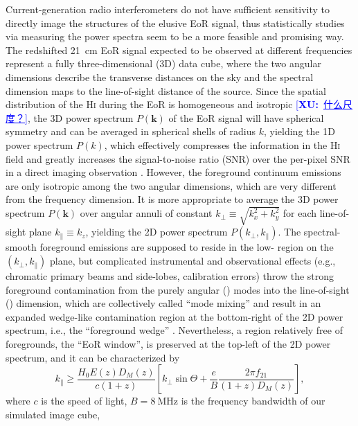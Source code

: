 \documentclass[modern]{aastex62}
\newcommand{\Hi}{H\textsc{i}}
\newcommand{\klos}{\text{$k_{\parallel}$}}
\newcommand{\kperp}{\text{$k_{\bot}$}}
\newcommand{\XU}[1]{\textcolor{blue}{[\textbf{XU:}~\uline{#1}]}}
\begin{document}
Current-generation radio interferometers do not have sufficient sensitivity
to directly image the structures of the elusive EoR signal,
thus statistically studies via measuring the power spectra seem to be
a more feasible and promising way.
The redshifted 21~cm EoR signal expected to be observed at different
frequencies represent a fully three-dimensional (3D) data cube, where the
two angular dimensions describe the transverse distances on the sky and
the spectral dimension maps to the line-of-sight distance of the source.
Since the spatial distribution of the \Hi{} during the EoR is homogeneous
and isotropic \XU{什么尺度？},
the 3D power spectrum $P(\mathbf{k})$ of the EoR signal
will have spherical symmetry and can be averaged in spherical shells of
radius $k$, yielding the 1D power spectrum $P(k)$, which effectively
compresses the information in the \Hi{} field and greatly increases the
signal-to-noise ratio (SNR) over the per-pixel SNR in a direct imaging
observation \citep{morales2004,morales2006,datta2010}.
However, the foreground continuum emissions are only isotropic among the
two angular dimensions, which are very different from the frequency
dimension.
It is more appropriate to average the 3D power spectrum $P(\mathbf{k})$
over angular annuli of constant $\kperp \equiv \sqrt{k_x^2 + k_y^2}$
for each line-of-sight plane $\klos \equiv k_z$, yielding the 2D power
spectrum $P(\kperp, \klos)$.
The spectral-smooth foreground emissions are supposed to reside in the
low-\klos{} region on the $(\kperp, \klos)$ plane,
but complicated instrumental and observational effects (e.g., chromatic
primary beams and side-lobes, calibration errors) throw the strong
foreground contamination from the purely angular (\kperp) modes into the
line-of-sight (\klos) dimension, which are collectively called
\enquote{mode mixing} and result in an expanded wedge-like contamination
region at the bottom-right of the 2D power spectrum, i.e., the
\enquote{foreground wedge} \citep[e.g.,][]{datta2010,morales2012,liu2014}.
Nevertheless, a region relatively free of foregrounds,
the \enquote{EoR window}, is preserved at the top-left of the 2D power
spectrum, and it can be characterized by \citep{thyagarajan2013}
\begin{equation}
  \label{eq:eor-window}
  \klos \geq \frac{H_0 E(z) D_{\!M}(z)}{c (1+z)} \left[
    \kperp \sin\Theta +
    \frac{e}{B} \frac{2\pi f_{21}}{(1+z) D_{\!M}(z)} \right],
\end{equation}
where
$c$ is the speed of light,
$B = \SI{8}{\MHz}$ is the frequency bandwidth of our simulated image cube,
\end{document}
